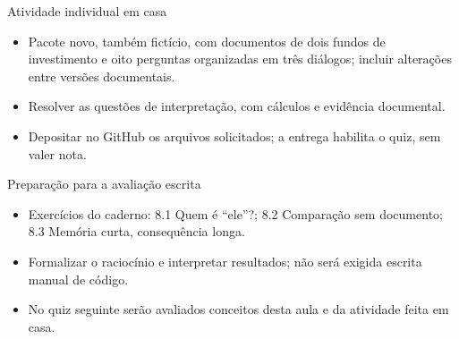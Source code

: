 \documentclass[10pt,aspectratio=169]{beamer}
\begin{document}
\begin{frame}[t]{Atividade individual em casa}
\small
\begin{itemize}
\item Pacote novo, também fictício, com documentos de dois fundos de investimento e oito perguntas organizadas em três diálogos; incluir alterações entre versões documentais.
\item Resolver as questões de interpretação, com cálculos e evidência documental.
\item Depositar no GitHub os arquivos solicitados; a entrega habilita o quiz, sem valer nota.
\end{itemize}
\end{frame}

\begin{frame}[t]{Preparação para a avaliação escrita}
\small
\begin{itemize}
\item Exercícios do caderno: 8.1 Quem é ``ele''?; 8.2 Comparação sem documento; 8.3 Memória curta, consequência longa.
\item Formalizar o raciocínio e interpretar resultados; não será exigida escrita manual de código.
\item No quiz seguinte serão avaliados conceitos desta aula e da atividade feita em casa.
\end{itemize}
\end{frame}
\end{document}
